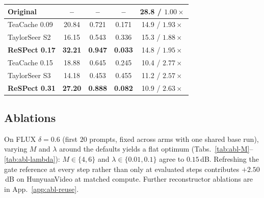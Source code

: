 \documentclass{article} %
\begin{document}
\begin{table}[t]
\begin{minipage}[t]{0.49\linewidth}
{{\begin{tabular}{lcccc}
      \midrule
      Original & -- & -- & -- & 28.8 / $1.00\times$ \\
      \midrule
      TeaCache 0.09 & 20.84 & 0.721 & 0.171 & 14.9 / $1.93\times$ \\
      TaylorSeer S2 & 16.15 & 0.543 & 0.336 & 15.3 / $1.88\times$ \\
      \textbf{ReSPect 0.17} & \textbf{32.21}  & \textbf{0.947}  & \textbf{0.033}  & 14.8 / \textbf{$1.95\times$} \\
      \midrule
      TeaCache 0.15 & 18.88 & 0.645 & 0.245 & 10.4 / $2.77\times$ \\
      TaylorSeer S3 & 14.18 & 0.453 & 0.455 & 11.2 / $2.57\times$ \\
      \textbf{ReSPect 0.31} & \textbf{27.20}  & \textbf{0.888}  & \textbf{0.082}  & 10.9 / \textbf{$2.63\times$} \\
      \bottomrule
    \end{tabular}}}
  \end{minipage}
\end{table}

\subsection{Ablations}
\label{sec:ablation}
On FLUX $\delta{=}0.6$ (first $20$ prompts, fixed across arms with one
shared base run), varying $M$ and $\lambda$ around the defaults yields
a flat optimum (Tabs.~\ref{tab:abl-M}--\ref{tab:abl-lambda}):
$M\in\{4,6\}$ and $\lambda\in\{0.01,0.1\}$ agree to $0.15$\,dB.
Refreshing the gate reference at every step rather than only at
evaluated steps contributes $+2.50$\,dB on HunyuanVideo at matched
compute. Further reconstructor ablations are in
App.~\ref{app:abl-reuse}.
\end{document}
